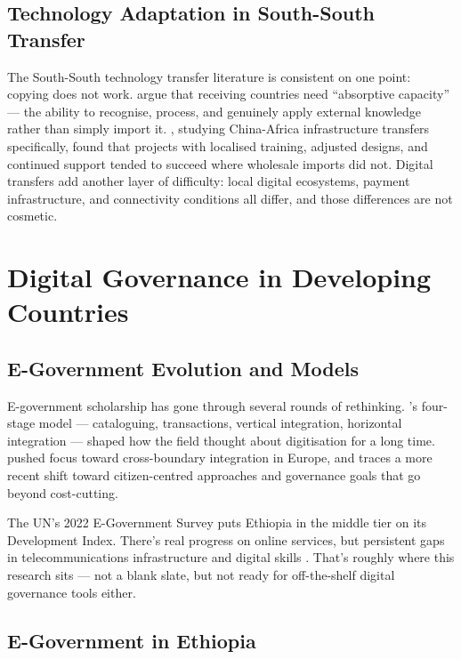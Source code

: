 \subsection{Technology Adaptation in South-South Transfer}

The South-South technology transfer literature is consistent on one point: copying does not work. \citet{Chen2018} argue that receiving countries need ``absorptive capacity'' --- the ability to recognise, process, and genuinely apply external knowledge rather than simply import it. \citet{Hensengerth2018}, studying China-Africa infrastructure transfers specifically, found that projects with localised training, adjusted designs, and continued support tended to succeed where wholesale imports did not. Digital transfers add another layer of difficulty: local digital ecosystems, payment infrastructure, and connectivity conditions all differ, and those differences are not cosmetic.

\section{Digital Governance in Developing Countries}

\subsection{E-Government Evolution and Models}

E-government scholarship has gone through several rounds of rethinking. \citet{Layne2001}'s four-stage model --- cataloguing, transactions, vertical integration, horizontal integration --- shaped how the field thought about digitisation for a long time. \citet{Wimmer2002} pushed focus toward cross-boundary integration in Europe, and \citet{Bannister2015} traces a more recent shift toward citizen-centred approaches and governance goals that go beyond cost-cutting.

The UN's 2022 E-Government Survey puts Ethiopia in the middle tier on its Development Index. There's real progress on online services, but persistent gaps in telecommunications infrastructure and digital skills \citep{UN2022}. That's roughly where this research sits --- not a blank slate, but not ready for off-the-shelf digital governance tools either.

\subsection{E-Government in Ethiopia}

